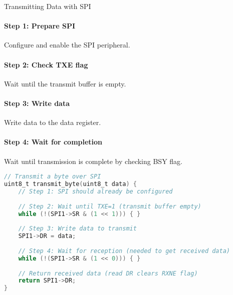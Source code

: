 \begin{KR}{Transmitting Data with SPI}
\paragraph{Step 1: Prepare SPI}
Configure and enable the SPI peripheral.
\paragraph{Step 2: Check TXE flag}
Wait until the transmit buffer is empty.
\paragraph{Step 3: Write data}
Write data to the data register.
\paragraph{Step 4: Wait for completion}
Wait until transmission is complete by checking BSY flag.

\begin{lstlisting}[language=C, style=basesmol]
// Transmit a byte over SPI
uint8_t transmit_byte(uint8_t data) {
    // Step 1: SPI should already be configured
    
    // Step 2: Wait until TXE=1 (transmit buffer empty)
    while (!(SPI1->SR & (1 << 1))) { }
    
    // Step 3: Write data to transmit
    SPI1->DR = data;
    
    // Step 4: Wait for reception (needed to get received data)
    while (!(SPI1->SR & (1 << 0))) { }
    
    // Return received data (read DR clears RXNE flag)
    return SPI1->DR;
}
\end{lstlisting}
\end{KR}


